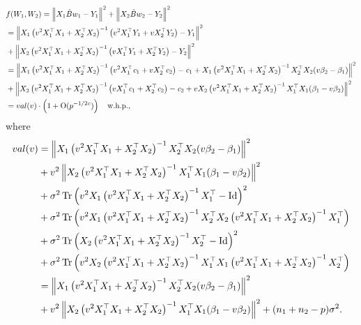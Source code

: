 {\color{red}\begin{align*}
			& f(W_1, W_2) = \left\| X_1 \hat B w_1 - Y_1 \right\|^2 + \left\| X_2 \hat B w_2 - Y_2 \right\|^2\\
			& =\left\| X_1\left( v^2 X_1^{\top}X_1 + X_2^{\top}X_2\right)^{-1} \left(v^2 X_1^{\top}Y_1 + vX_2^{\top}Y_2\right) - Y_1 \right\|^2 \\
			&+ \left\| X_2 \left( v^2 X_1^{\top}X_1 + X_2^{\top}X_2\right)^{-1} \left(vX_1^{\top}Y_1 + X_2^{\top}Y_2\right) - Y_2 \right\|^2 \\
			& =\left\| X_1\left( v^2 X_1^{\top}X_1 + X_2^{\top}X_2\right)^{-1} \left(v^2 X_1^{\top}{\mathit{c}}_1 + vX_2^{\top}{\mathit{c}}_2\right) - {\mathit{c}}_1 + X_1\left( v^2 X_1^{\top}X_1 + X_2^{\top}X_2\right)^{-1}  X_2^{\top}X_2(v\beta_2-\beta_1)  \right\|^2 \\
			&+ \left\| X_2 \left( v^2 X_1^{\top}X_1 + X_2^{\top}X_2\right)^{-1} \left(vX_1^{\top}{\mathit{c}}_1 + X_2^{\top}{\mathit{c}}_2\right) - {\mathit{c}}_2 + vX_2 \left( v^2 X_1^{\top}X_1 + X_2^{\top}X_2\right)^{-1}  X_1^{\top}X_1(\beta_1-v\beta_2)  \right\|^2 \\
			&=val(v)\cdot \left( 1+\operatorname{O}(p^{-1/2{\mathit{c}}})\right) \quad \text{w.h.p.},
		\end{align*}
		where
		\begin{align*}
		val(v)&=\left\| X_1\left( v^2 X_1^{\top}X_1 + X_2^{\top}X_2\right)^{-1}  X_2^{\top}X_2(v\beta_2-\beta_1)  \right\|^2 \\
			&+ v^2\left\| X_2 \left( v^2 X_1^{\top}X_1 + X_2^{\top}X_2\right)^{-1}  X_1^{\top}X_1(\beta_1-v\beta_2)  \right\|^2 \\
			&+\sigma^2 \operatorname{Tr}\left(v^2 X_1\left( v^2 X_1^{\top}X_1 + X_2^{\top}X_2\right)^{-1}   X_1^{\top} -\operatorname{Id}\right)^2 \\
			&+\sigma^2 \operatorname{Tr}\left(v^2 X_1\left( v^2 X_1^{\top}X_1 + X_2^{\top}X_2\right)^{-1}X_2^{\top}X_2 \left( v^2 X_1^{\top}X_1 + X_2^{\top}X_2\right)^{-1} X_1^\top\right)\\
			&+\sigma^2 \operatorname{Tr}\left(X_2 \left( v^2 X_1^{\top}X_1 + X_2^{\top}X_2\right)^{-1} X_2^{\top} -\operatorname{Id}\right)^2 \\
			&+\sigma^2 \operatorname{Tr}\left(v^2 X_2\left( v^2 X_1^{\top}X_1 + X_2^{\top}X_2\right)^{-1}X_1^{\top}X_1 \left( v^2 X_1^{\top}X_1 + X_2^{\top}X_2\right)^{-1} X_2^\top\right)\\
			&=\left\| X_1\left( v^2 X_1^{\top}X_1 + X_2^{\top}X_2\right)^{-1}  X_2^{\top}X_2(v\beta_2-\beta_1)  \right\|^2 \\
			&+ v^2\left\| X_2 \left( v^2 X_1^{\top}X_1 + X_2^{\top}X_2\right)^{-1}  X_1^{\top}X_1(\beta_1-v\beta_2)  \right\|^2 +(n_1+n_2-p)\sigma^2.
		\end{align*}
	}





